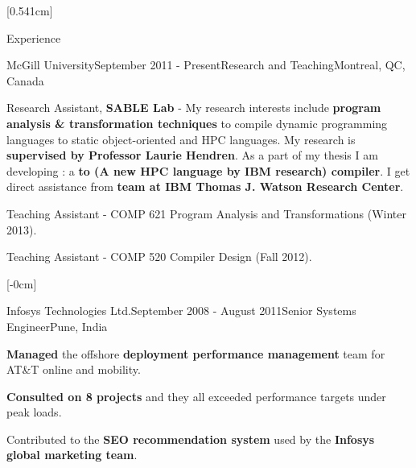 \documentclass{resume} %
\begin{document}
[0.541cm]%
\begin{rSection}{Experience}
\begin{rSubsection}{McGill University}{September 2011 - Present}{Research and Teaching}{Montreal, QC, Canada}
\item Research Assistant, \textbf{SABLE Lab} - My research interests include \textbf{program analysis \& transformation techniques} to compile dynamic 
programming languages to static object-oriented and HPC languages. My research is \textbf{supervised by Professor Laurie Hendren}. As a part of my thesis 
I am developing \mixten: a \textbf{\matlab to \xten (A new HPC language by IBM research) compiler}. I get direct assistance 
from \textbf{\xten team at IBM Thomas J. Watson Research Center}.   
\item Teaching Assistant - COMP 621 Program Analysis and Transformations (Winter 2013). 
\item Teaching Assistant - COMP 520 Compiler Design (Fall 2012).
\end{rSubsection}

[-0cm]
\begin{rSubsection}{Infosys Technologies Ltd.}{September 2008 - August 2011}{Senior Systems Engineer}{Pune, India}
\item \textbf{Managed} the offshore \textbf{deployment performance management} team for AT\&T online and mobility.
\item \textbf{Consulted on 8 projects} and they all exceeded performance targets under peak loads.
\item Contributed to the \textbf{SEO recommendation system} used by the \textbf{Infosys global marketing team}.
\end{rSubsection}


\end{rSection}
\end{document}
